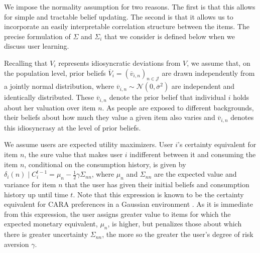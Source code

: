 \documentclass[manuscript]{acmart}
\begin{document}
We impose the normality assumption for two reasons. The first is that this allows for simple and tractable belief updating. The second is that it allows us to incorporate an easily interpretable correlation structure between the items. The precise formulation of $\Sigma$ and $\Sigma_i$ that we consider is defined below when we discuss user learning.
\par
Recalling that $V_i$ represents idiosyncratic deviations from $V$, we assume that, on the population level, prior beliefs $\overline V_i=\left(\overline v_{i,n}\right)_{n \in \mathcal{J}}$ are drawn independently from a jointly normal distribution, where $\overline v_{i,n} \sim \mathcal N (0, \overline \sigma^2)$ are independent and identically distributed. These $\overline v_{i,n}$ denote the prior belief that individual $i$ holds about her valuation over item $n$. As people are exposed to different backgrounds, their beliefs about how much they value a given item also varies and $\overline v_{i,n}$ denotes this idiosyncrasy at the level of prior beliefs.
\par

We assume users are expected utility maximizers. User $i$'s certainty equivalent for item $n$, the sure value that makes user $i$ indifferent between it and consuming the item $n$, conditional on the consumption history, is given by
$\delta_{i}(n)\mid C_i^{t-1}=\mu_n-\frac{1}{2}\gamma \Sigma_{nn}$, where $\mu_n$ and $\Sigma_{nn}$ are the expected value and variance for item $n$ that the user has given their initial beliefs and consumption history up until time $t$. Note that this expression is known to be the certainty equivalent for CARA preferences in a Gaussian environment \cite{mas1995microeconomic}. As it is immediate from this expression, the user assigns greater value to items for which the expected monetary equivalent, $\mu_n$, is higher, but penalizes those about which there is greater uncertainty $\Sigma_{nn}$, the more so the greater the user's degree of risk aversion $\gamma$.
\end{document}
